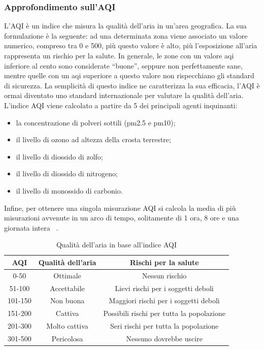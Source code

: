 \subsubsection{Approfondimento sull'AQI}
L'AQI è un indice che misura la qualità dell'aria in un'area geografica.
La sua formulazione è la seguente: ad una determinata zona viene associato un valore numerico, compreso tra 0 e 500, più questo valore è alto, più l'esposizione all'aria rappresenta un rischio per la salute.
In generale, le zone con un valore aqi inferiore al cento sono considerate “buone”, seppure non perfettamente sane, mentre quelle con un aqi superiore a questo valore non rispecchiano gli standard di sicurezza.
La semplicità di questo indice ne caratterizza la sua efficacia, l'AQI è ormai diventato uno standard internazionale per valutare la qualità dell'aria.
L'indice AQI viene calcolato a partire da 5 dei principali agenti inquinanti:
\begin{itemize}
  \item{la concentrazione di polveri sottili (pm2.5 e pm10);}
  \item{il livello di ozono ad altezza della crosta terrestre;}
  \item{il livello di diossido di zolfo;}
  \item{il livello di diossido di nitrogeno;}
  \item{il livello di monossido di carbonio.}  
\end{itemize}
Infine, per ottenere una singola misurazione AQI si calcola la media di più misurazioni avvenute in un arco di tempo, solitamente di 1 ora, 8 ore e una giornata intera  ~\cite{aqibasics}.
	

\begin{table}[h]
  \centering
  \caption{Qualità dell'aria in base all'indice AQI}
  \label{tab:aqi}
  \begin{tabular}{|c|c|c|}
    \hline
    AQI & Qualità dell'aria & Rischi per la salute \\ \hline
    \rowcolor{Green} 0-50 & Ottimale & Nessun rischio \\ \hline
    \rowcolor{Yellow} 51-100 & Accettabile & Lievi rischi per i soggetti deboli \\ \hline
    \rowcolor{Orange} 101-150 & Non buona & Maggiori rischi per i soggetti deboli \\ \hline
    \rowcolor{Red} 151-200 & Cattiva & Possibili rischi per tutta la popolazione \\ \hline
    \rowcolor{Purple} 201-300 & Molto cattiva & Seri rischi per tutta la popolazione \\ \hline
    \rowcolor{Maroon} 301-500 & Pericolosa & Nessuno dovrebbe uscire \\ \hline
  \end{tabular}
\end{table}

